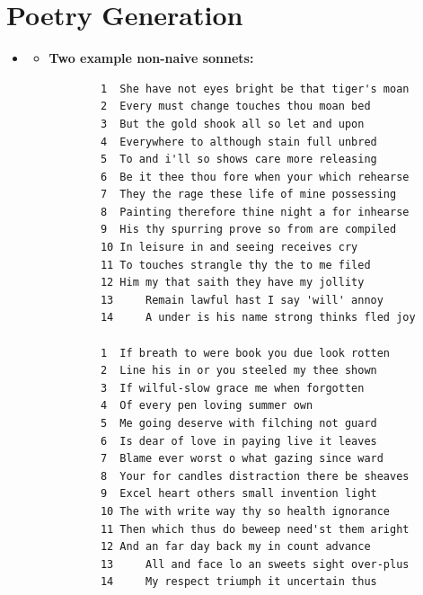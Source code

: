 
\section{Poetry Generation}
\medskip
\begin{itemize}

    \item {}

    \begin{itemize}
    \item \textbf{Two example non-naive sonnets:}
    \begin{verbatim}
        1  She have not eyes bright be that tiger's moan
        2  Every must change touches thou moan bed
        3  But the gold shook all so let and upon
        4  Everywhere to although stain full unbred
        5  To and i'll so shows care more releasing
        6  Be it thee thou fore when your which rehearse
        7  They the rage these life of mine possessing
        8  Painting therefore thine night a for inhearse
        9  His thy spurring prove so from are compiled
        10 In leisure in and seeing receives cry
        11 To touches strangle thy the to me filed
        12 Him my that saith they have my jollity
        13     Remain lawful hast I say 'will' annoy
        14     A under is his name strong thinks fled joy

        1  If breath to were book you due look rotten
        2  Line his in or you steeled my thee shown
        3  If wilful-slow grace me when forgotten
        4  Of every pen loving summer own
        5  Me going deserve with filching not guard
        6  Is dear of love in paying live it leaves
        7  Blame ever worst o what gazing since ward
        8  Your for candles distraction there be sheaves
        9  Excel heart others small invention light
        10 The with write way thy so health ignorance
        11 Then which thus do beweep need'st them aright
        12 And an far day back my in count advance
        13     All and face lo an sweets sight over-plus
        14     My respect triumph it uncertain thus
    \end{verbatim}


\end{itemize}
\end{itemize}
